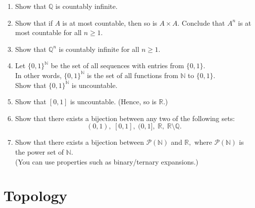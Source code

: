 \documentclass[12pt]{article}
\theoremstyle{definition}
\numberwithin{thm}{section}
\begin{document}
\begin{enumerate}
	\item Show that $\mathbb{Q}$ is countably infinite.
	\item Show that if $A$ is at most countable, then so is $A \times A.$ Conclude that $A^n$ is at most countable for all $n \ge 1.$
	\item Show that $\mathbb{Q}^n$ is countably infinite for all $n \ge 1.$
	\item Let $\{0, 1\}^\mathbb{N}$ be the set of all sequences with entries from $\{0, 1\}.$\\
	In other words, $\{0, 1\}^\mathbb{N}$ is the set of all functions from $\mathbb{N}$ to $\{0, 1\}.$\\
	Show that $\{0, 1\}^\mathbb{N}$ is uncountable.
	\item Show that $[0, 1]$ is uncountable. (Hence, so is $\mathbb{R}.$)
	\item Show that there exists a bijection between any two of the following sets: 
	\begin{equation*} 
		(0, 1),\; [0, 1],\; (0, 1],\; \mathbb{R},\; \mathbb{R}\setminus\mathbb{Q}.
	\end{equation*}
	\item Show that there exists a bijection between $\mathcal{P}(\mathbb{N})$ and $\mathbb{R},$ where $\mathcal{P}(\mathbb{N})$ is the power set of $\mathbb{N}.$\\
	(You can use properties such as binary/ternary expansions.)
\end{enumerate}
\newpage\section{Topology}
\end{document}
